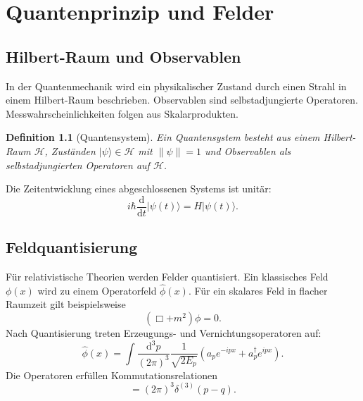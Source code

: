 \documentclass[11pt,a4paper]{book}
\newtheorem{definition}{Definition}[chapter]
\theoremstyle{remark}
\newcommand{\Hh}{\mathcal{H}}
\newcommand{\diff}{\mathrm{d}}
\newcommand{\Boxop}{\Box}
\newcommand{\ket}[1]{|#1\rangle}
\begin{document}
\chapter{Quantenprinzip und Felder}
\section{Hilbert-Raum und Observablen}
In der Quantenmechanik wird ein physikalischer Zustand durch einen Strahl in einem Hilbert-Raum beschrieben. Observablen sind selbstadjungierte Operatoren. Messwahrscheinlichkeiten folgen aus Skalarprodukten.

\begin{definition}[Quantensystem]
Ein Quantensystem besteht aus einem Hilbert-Raum $\Hh$, Zuständen $\ket{\psi}\in\Hh$ mit $\|\psi\|=1$ und Observablen als selbstadjungierten Operatoren auf $\Hh$.
\end{definition}

Die Zeitentwicklung eines abgeschlossenen Systems ist unitär:
\begin{equation}
i\hbar\frac{\diff}{\diff t}\ket{\psi(t)}=H\ket{\psi(t)}.
\end{equation}

\section{Feldquantisierung}
Für relativistische Theorien werden Felder quantisiert. Ein klassisches Feld $\phi(x)$ wird zu einem Operatorfeld $\hat\phi(x)$. Für ein skalares Feld in flacher Raumzeit gilt beispielsweise
\begin{equation}
(\Boxop + m^2)\phi=0.
\end{equation}
Nach Quantisierung treten Erzeugungs- und Vernichtungsoperatoren auf:
\begin{equation}
\hat\phi(x)=\int \frac{\diff^3p}{(2\pi)^3}\frac{1}{\sqrt{2E_p}}\left(a_p e^{-ipx}+a_p^\dagger e^{ipx}\right).
\end{equation}
Die Operatoren erfüllen Kommutationsrelationen
\begin{equation}
[a_p,a_q^\dagger]=(2\pi)^3\delta^{(3)}(p-q).
\end{equation}
\end{document}

